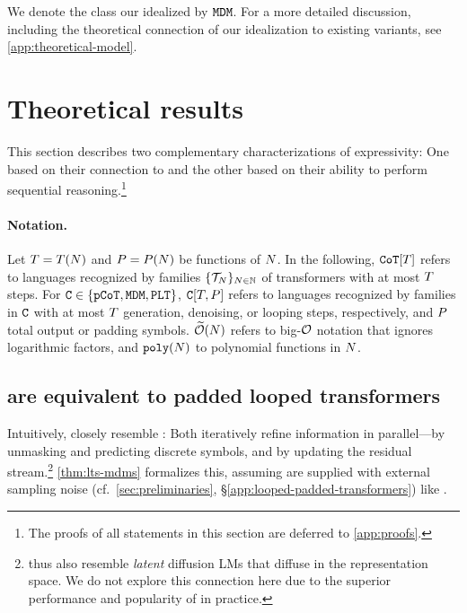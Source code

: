 \documentclass{article} %
\begin{document}
We denote the class our idealized \MDMsAcr by ${\mathtt{MDM}}$.
For a more detailed discussion, including the theoretical connection of our idealization to existing \MDMAcr variants, see \cref{app:theoretical-model}.


\section{Theoretical results}
\label{sec:theoretical-results}

This section describes two complementary characterizations of \MDMAcr expressivity: One based on their connection to \LTsAcr and the other based on their ability to perform sequential \CoTAcr reasoning.\footnote{The proofs of all statements in this section are deferred to \cref{app:proofs}.}

\paragraph{Notation.}
Let ${T} = {T}({{N}})$ and ${P} = {P}({{N}})$ be functions of ${{N}}$.
In the following, ${\mathtt{CoT}}[{T}]$ refers to languages recognized by families $\{{{\mathcal{T}}}_{{N}}\}_{{{N}} \in {{\mathbb{N}}}}$ of \CoTAcr transformers with at most ${T}$ steps.
For ${\mathtt{C}} \in \{{\mathtt{pCoT}},{\mathtt{MDM}},{\mathtt{PLT}}\}$, ${\mathtt{C}}[{T}, {P}]$ refers to languages recognized by families in ${\mathtt{C}}$ with at most ${T}$ generation, denoising, or looping steps, respectively, and ${P}$ total output or padding symbols.
${{{{\widetilde{{{\mathcal{O}}}}}}({{N}})}}$ refers to big-${{\mathcal{O}}}$ notation that ignores logarithmic factors, and $\polyFun{\strlen}$ to polynomial functions in ${{N}}$.


\subsection{\MDMsAcr are equivalent to padded looped transformers} \label{sec:mdms-and-lts}

Intuitively, \LTsAcr closely resemble \MDMsAcr: Both iteratively refine information in parallel---\MDMsAcr by unmasking and predicting discrete symbols, and \LTsAcr by updating the residual stream.\footnote{\LTsAcr thus also resemble \emph{latent} diffusion LMs that diffuse in the representation space. We do not explore this connection here due to the superior performance and popularity of \MDMsAcr \citep{zhang2025surveyparalleltextgeneration} in practice.}
\cref{thm:lts-mdms} formalizes this, assuming \LTsAcr are supplied with external sampling noise (cf.~\cref{sec:preliminaries}, \S\ref{app:looped-padded-transformers}) like \MDMsAcr.
\end{document}
